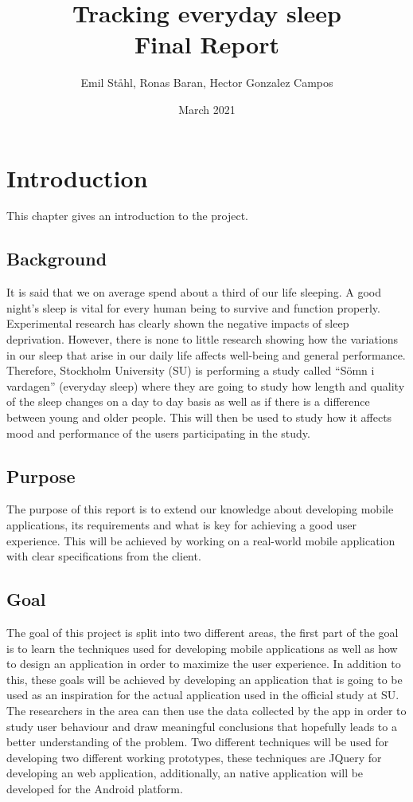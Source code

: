 \documentclass{article}
\title{Tracking everyday sleep \\ Final Report}
\author{Emil Ståhl, Ronas Baran, Hector Gonzalez Campos}
\date{March 2021}
\begin{document}
\maketitle

\section{Introduction}
This chapter gives an introduction to the project.

\subsection{Background}
It is said that we on average spend about a third of our life sleeping.  A good night's sleep is vital for every human being to survive and function properly. Experimental research has clearly shown the negative impacts of sleep deprivation.\cite{ohlmann_costs_2009} However, there is none to little research showing how the variations in our sleep that arise in our daily life affects well-being and general performance. Therefore, Stockholm University (SU) is performing a study called “Sömn i vardagen” (everyday sleep) where they are going to study how length and quality of the sleep changes on a day to day basis as well as if there is a difference between young and older people. This will then be used to study how it affects mood and performance of the users participating in the study.\cite{schwarz_anslag_nodate}

\subsection{Purpose}
The purpose of this report is to extend our knowledge about developing mobile applications, its requirements and what is key for achieving a good user experience. This will be achieved by working on a real-world mobile application with clear specifications from the client. 

\subsection{Goal}
The goal of this project is split into two different areas, the first part of the goal is to learn the techniques used for developing mobile applications as well as how to design an application in order to maximize the user experience. In addition to this, these goals will be achieved by developing an application that is going to be used as an inspiration for the actual application used in the official study at SU. The researchers in the area can then use the data collected by the app in order to study user behaviour and draw meaningful conclusions that hopefully leads to a better understanding of the problem. Two different techniques will be used for developing two different working prototypes, these techniques are JQuery for developing an web application, additionally, an native application will be developed for the Android platform. 
\end{document}
